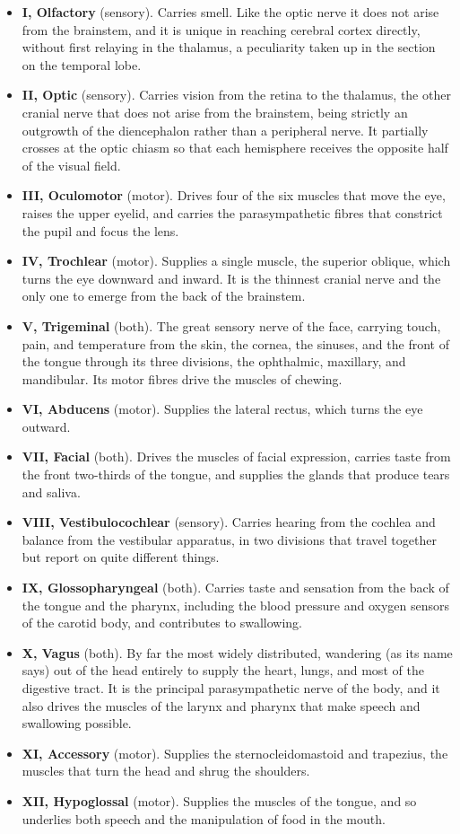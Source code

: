 \documentclass[11pt]{article}
\begin{document}
\begin{itemize}
    \item \textbf{I, Olfactory} (sensory). Carries smell. Like the optic nerve it does not arise from the brainstem, and it is unique in reaching cerebral cortex directly, without first relaying in the thalamus, a peculiarity taken up in the section on the temporal lobe.
    \item \textbf{II, Optic} (sensory). Carries vision from the retina to the thalamus, the other cranial nerve that does not arise from the brainstem, being strictly an outgrowth of the diencephalon rather than a peripheral nerve. It partially crosses at the optic chiasm so that each hemisphere receives the opposite half of the visual field.
    \item \textbf{III, Oculomotor} (motor). Drives four of the six muscles that move the eye, raises the upper eyelid, and carries the parasympathetic fibres that constrict the pupil and focus the lens.
    \item \textbf{IV, Trochlear} (motor). Supplies a single muscle, the superior oblique, which turns the eye downward and inward. It is the thinnest cranial nerve and the only one to emerge from the back of the brainstem.
    \item \textbf{V, Trigeminal} (both). The great sensory nerve of the face, carrying touch, pain, and temperature from the skin, the cornea, the sinuses, and the front of the tongue through its three divisions, the ophthalmic, maxillary, and mandibular. Its motor fibres drive the muscles of chewing.
    \item \textbf{VI, Abducens} (motor). Supplies the lateral rectus, which turns the eye outward.
    \item \textbf{VII, Facial} (both). Drives the muscles of facial expression, carries taste from the front two-thirds of the tongue, and supplies the glands that produce tears and saliva.
    \item \textbf{VIII, Vestibulocochlear} (sensory). Carries hearing from the cochlea and balance from the vestibular apparatus, in two divisions that travel together but report on quite different things.
    \item \textbf{IX, Glossopharyngeal} (both). Carries taste and sensation from the back of the tongue and the pharynx, including the blood pressure and oxygen sensors of the carotid body, and contributes to swallowing.
    \item \textbf{X, Vagus} (both). By far the most widely distributed, wandering (as its name says) out of the head entirely to supply the heart, lungs, and most of the digestive tract. It is the principal parasympathetic nerve of the body, and it also drives the muscles of the larynx and pharynx that make speech and swallowing possible.
    \item \textbf{XI, Accessory} (motor). Supplies the sternocleidomastoid and trapezius, the muscles that turn the head and shrug the shoulders.
    \item \textbf{XII, Hypoglossal} (motor). Supplies the muscles of the tongue, and so underlies both speech and the manipulation of food in the mouth.
\end{itemize}
\end{document}
